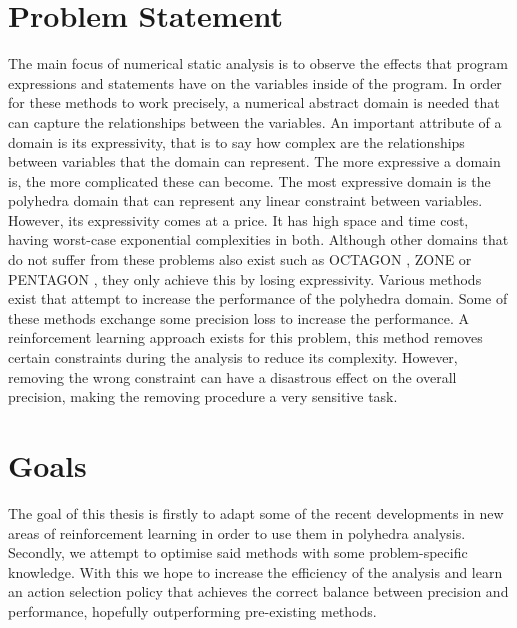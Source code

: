 \section{Problem Statement}
The main focus of numerical static analysis is to observe the effects that program expressions and statements have on the variables inside of the program. In order for these methods to work precisely, a numerical abstract domain is needed that can capture the relationships between the variables. An important attribute of a domain is its expressivity, that is to say how complex are the relationships between variables that the domain can represent. The more expressive a domain is, the more complicated these can become. The most expressive domain is the polyhedra domain that can represent any linear constraint between variables. However, its expressivity comes at a price. It has high space and time cost, having worst-case exponential complexities in both. Although other domains that do not suffer from these problems also exist such as OCTAGON \cite{mine2006octagon}, ZONE \cite{mine2001new} or PENTAGON \cite{logozzo2010pentagons}, they only achieve this by losing expressivity. Various methods exist that attempt to increase the performance of the polyhedra domain. Some of these methods exchange some precision loss to increase the performance. A reinforcement learning approach exists for this problem, this method removes certain constraints during the analysis to reduce its complexity.  However, removing the wrong constraint can have a disastrous effect on the overall precision, making the removing procedure a very sensitive task.
\section{Goals}
The goal of this thesis is firstly to adapt some of the recent developments in new areas of reinforcement learning in order to use them in polyhedra analysis. Secondly, we attempt to optimise said methods with some problem-specific knowledge. With this we hope to increase the efficiency of the analysis and learn an action selection policy that achieves the correct balance between precision and performance, hopefully outperforming pre-existing methods. 
